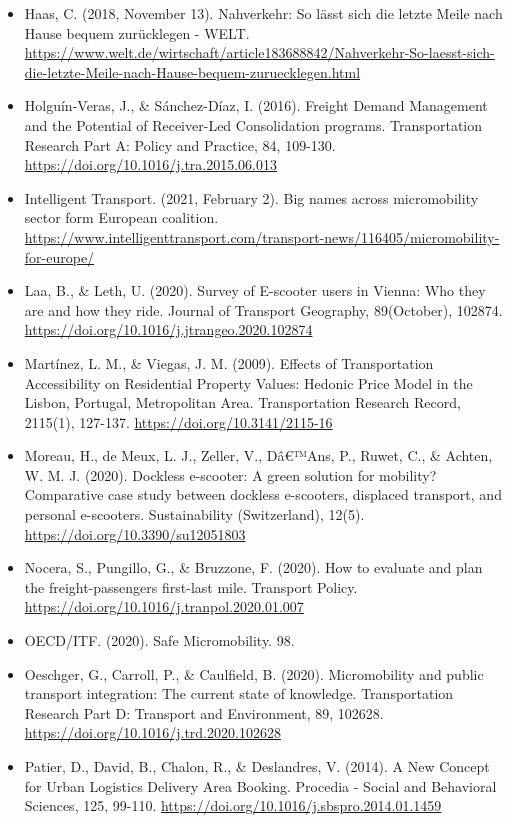 \documentclass[
]{book}
\begin{document}
\begin{itemize}
\item
  Haas, C. (2018, November 13). Nahverkehr: So lässt sich die letzte Meile nach Hause bequem zurücklegen - WELT. \url{https://www.welt.de/wirtschaft/article183688842/Nahverkehr-So-laesst-sich-die-letzte-Meile-nach-Hause-bequem-zuruecklegen.html}
\item
  Holguín-Veras, J., \& Sánchez-Díaz, I. (2016). Freight Demand Management and the Potential of Receiver-Led Consolidation programs. Transportation Research Part A: Policy and Practice, 84, 109-130. \url{https://doi.org/10.1016/j.tra.2015.06.013}
\item
  Intelligent Transport. (2021, February 2). Big names across micromobility sector form European coalition. \url{https://www.intelligenttransport.com/transport-news/116405/micromobility-for-europe/}
\item
  Laa, B., \& Leth, U. (2020). Survey of E-scooter users in Vienna: Who they are and how they ride. Journal of Transport Geography, 89(October), 102874. \url{https://doi.org/10.1016/j.jtrangeo.2020.102874}
\item
  Martínez, L. M., \& Viegas, J. M. (2009). Effects of Transportation Accessibility on Residential Property Values: Hedonic Price Model in the Lisbon, Portugal, Metropolitan Area. Transportation Research Record, 2115(1), 127-137. \url{https://doi.org/10.3141/2115-16}
\item
  Moreau, H., de Meux, L. J., Zeller, V., Dâ€™Ans, P., Ruwet, C., \& Achten, W. M. J. (2020). Dockless e-scooter: A green solution for mobility? Comparative case study between dockless e-scooters, displaced transport, and personal e-scooters. Sustainability (Switzerland), 12(5). \url{https://doi.org/10.3390/su12051803}
\item
  Nocera, S., Pungillo, G., \& Bruzzone, F. (2020). How to evaluate and plan the freight-passengers first-last mile. Transport Policy. \url{https://doi.org/10.1016/j.tranpol.2020.01.007}
\item
  OECD/ITF. (2020). Safe Micromobility. 98.
\item
  Oeschger, G., Carroll, P., \& Caulfield, B. (2020). Micromobility and public transport integration: The current state of knowledge. Transportation Research Part D: Transport and Environment, 89, 102628. \url{https://doi.org/10.1016/j.trd.2020.102628}
\item
  Patier, D., David, B., Chalon, R., \& Deslandres, V. (2014). A New Concept for Urban Logistics Delivery Area Booking. Procedia - Social and Behavioral Sciences, 125, 99-110. \url{https://doi.org/10.1016/j.sbspro.2014.01.1459}

\end{itemize}
\end{document}
